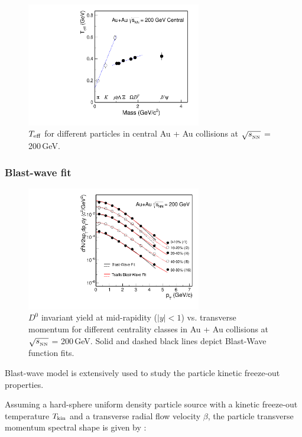 \begin{figure}
\centering
\includegraphics[width=0.68\textwidth]{figure/Run14_D0HFT/Teff_ALL.pdf}
\caption{$T_{\rm eff}$ for different particles in central Au + Au collisions at $\sqrt{s_{_{\rm NN}}}$ = 200\,GeV.}
\label{Teff_ALL} 
\end{figure}


\subsubsection{\label{result:collectivity:BW}Blast-wave fit}

\begin{figure}
\centering
\includegraphics[width=0.68\textwidth]{figure/Run14_D0HFT/BWFit.pdf}
\caption{$D^{0}$ invariant yield at mid-rapidity ($|y|<1$) vs. transverse momentum for different centrality classes in Au + Au collisions at $\sqrt{s_{_{\rm NN}}}$ = 200\,GeV. Solid and dashed black lines depict Blast-Wave function fits.}
\label{Teff_ALL} 
\end{figure}


Blast-wave model is extensively used to study the particle kinetic freeze-out properties. 

Assuming a hard-sphere uniform density particle source with a kinetic freeze-out temperature $T_{\rm kin}$ and a transverse radial flow velocity $\beta$, the particle transverse momentum spectral shape is given by :

